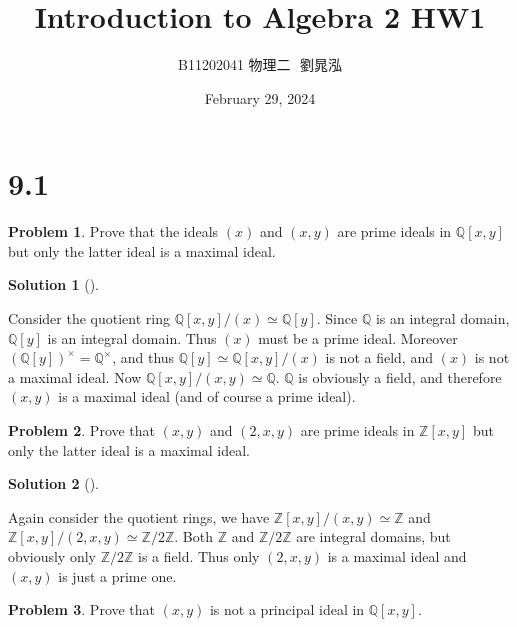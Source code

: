 \documentclass{article}
\title{Introduction to Algebra 2 HW1}
\author{B11202041 物理二 $ $ 劉晁泓}
\date{February 29, 2024}
\theoremstyle{definition}
\newtheorem{prob}{Problem}
\newtheorem*{sol}{Solution}
\newenvironment{sols}[1][]{%
  \begin{sol}[#1]$ $\par\nobreak\ignorespaces
}{%
  \end{sol}
}
\begin{document}
\maketitle
\thispagestyle{fancy}
\renewcommand{\footrulewidth}{0.4pt}
\cfoot{\thepage}
\renewcommand{\headrulewidth}{0.4pt}

\section*{9.1}

\setcounter{prob}{3}
\begin{prob}
  Prove that the ideals $(x)$ and $(x, y)$ are prime ideals in $\mathbb{Q}[x, y]$ but only the latter ideal is a maximal ideal. 
\end{prob}

\begin{sols}  
  Consider the quotient ring $\mathbb{Q}[x, y]/(x) \simeq \mathbb{Q}[y]$. Since $\mathbb{Q}$ is an integral domain, $\mathbb{Q}[y]$ is an integral domain. Thus $(x)$ must be a prime ideal. Moreover $(\mathbb{Q}[y])^\times = \mathbb{Q}^\times$, and thus $\mathbb{Q}[y] \simeq \mathbb{Q}[x, y]/(x) $ is not a field, and $(x)$ is not a maximal ideal. Now $\mathbb{Q}[x, y]/ (x, y) \simeq \mathbb{Q}$. $\mathbb{Q}$ is obviously a field, and therefore $(x, y)$ is a maximal ideal (and of course a prime ideal).  
\end{sols}

\begin{prob}
  Prove that $(x, y)$ and $(2, x, y)$ are prime ideals in $\mathbb{Z}[x, y]$ but only the latter ideal is a maximal ideal. 
\end{prob}

\begin{sols}
  Again consider the quotient rings, we have $\mathbb{Z}[x, y]/(x, y) \simeq \mathbb{Z}$ and $\mathbb{Z}[x, y]/(2, x, y) \simeq \mathbb{Z}/2 \mathbb{Z}$. Both $\mathbb{Z}$ and $\mathbb{Z}/2 \mathbb{Z}$ are integral domains, but obviously only $\mathbb{Z}/2 \mathbb{Z}$ is a field. Thus only $(2, x, y)$ is a maximal ideal and $(x, y)$ is just a prime one.  
\end{sols}


\begin{prob}
  Prove that $(x, y)$ is not a principal ideal in $\mathbb{Q}[x, y]$. 
\end{prob}
\end{document}
